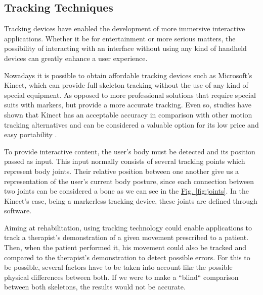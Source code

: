 \documentclass[runningheads]{llncs}
\begin{document}
\subsection{Tracking Techniques} 

Tracking devices have enabled the development of more immersive interactive applications.
Whether it be for entertainment or more serious matters, the possibility of interacting with 
an interface without using any kind of handheld devices can greatly enhance a user experience.

Nowadays it is possible to obtain affordable tracking devices such as Microsoft's Kinect, which 
can provide full skeleton tracking without the use of any kind of special equipment.
As opposed to more professional solutions that require special suits with markers, but provide a more accurate tracking. 
Even so, studies have shown that Kinect has an acceptable accuracy in comparison with other motion tracking alternatives 
and can be considered a valuable option for its low price and easy portability \cite{Scano2014,Chang2012a}.

To provide interactive content, the user's body must be detected and its position passed as input. This input normally consists of several tracking points which represent body joints. Their relative position between one another give us a representation of the user's current body posture, since each connection between two joints can be considered a bone as we can see in the 
\hyperref[fig:joints]{Fig. \ref{fig:joints}}.
In the Kinect's case, being a markerless tracking device, these joints are defined through software.


Aiming at rehabilitation, using tracking technology could enable applications to track a therapist's demonstration of a given movement prescribed to a patient.
Then, when the patient performed it, his movement could also be tracked and compared to the therapist's demonstration to detect possible errors.
For this to be possible, several factors have to be taken into account like the possible physical differences between both. If we were to make a ``blind`` comparison between both skeletons, the results would not be accurate.
\end{document}
